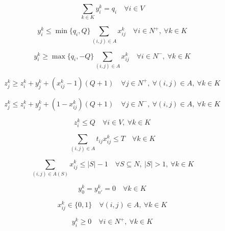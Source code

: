 \documentclass{article}
\begin{document}
\begin{equation}
\sum_{k \in K} y_i^k = q_i
\quad \forall i \in V
\tag{EC.2d}
\end{equation}

\begin{equation}
y_i^k \le \min\{q_i,Q\} \sum_{(i,j) \in A} x_{ij}^{k}
\quad \forall i \in N^{+},\ \forall k \in K
\tag{EC.2e}
\end{equation}

\begin{equation}
y_i^k \ge \max\{q_i,-Q\} \sum_{(i,j) \in A} x_{ij}^{k}
\quad \forall i \in N^{-},\ \forall k \in K
\tag{EC.2f}
\end{equation}

\begin{equation}
z_j^k \ge z_i^k + y_j^k + (x_{ij}^{k} - 1)(Q+1)
\quad \forall j \in N^{+},\ \forall (i,j) \in A,\ \forall k \in K
\tag{EC.2g}
\end{equation}

\begin{equation}
z_j^k \le z_i^k + y_j^k + (1 - x_{ij}^{k})(Q+1)
\quad \forall j \in N^{-},\ \forall (i,j) \in A,\ \forall k \in K
\tag{EC.2h}
\end{equation}

\begin{equation}
z_i^k \le Q
\quad \forall i \in V,\ \forall k \in K
\tag{EC.2i}
\end{equation}

\begin{equation}
\sum_{(i,j) \in A} t_{ij} x_{ij}^{k} \le T
\quad \forall k \in K
\tag{EC.2j}
\end{equation}

\begin{equation}
\sum_{(i,j) \in A(S)} x_{ij}^{k} \le |S| - 1
\quad \forall S \subseteq N,\ |S| > 1,\ \forall k \in K
\tag{EC.2k}
\end{equation}

\begin{equation}
y_0^k = y_{n'}^k = 0
\quad \forall k \in K
\tag{EC.2l}
\end{equation}

\begin{equation}
x_{ij}^{k} \in \{0,1\}
\quad \forall (i,j) \in A,\ \forall k \in K
\tag{EC.2m}
\end{equation}

\begin{equation}
y_i^k \ge 0
\quad \forall i \in N^{+},\ \forall k \in K
\tag{EC.2n}
\end{equation}
\end{document}

